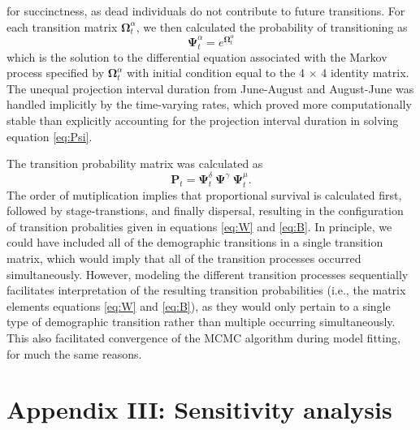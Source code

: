 \documentclass[11pt]{article}
\begin{document}
for succinctness, as dead individuals do not contribute to future transitions.
For each transition matrix $\boldsymbol\Omega^{\alpha}_t$, 
we then calculated the probability of transitioning as
%
\begin{equation} \label{eq:Psi}
\boldsymbol\Psi^{\alpha}_t = e^{\boldsymbol\Omega^{\alpha}_t}
\end{equation}
%
which is the solution to the differential equation associated with the Markov process
specified by $\boldsymbol\Omega^{\alpha}_t$ 
with initial condition equal to the 4 $\times$ 4 identity matrix.
The unequal projection interval duration from June-August and August-June was handled 
implicitly by the time-varying rates, 
which proved more computationally stable than explicitly accounting for the projection
interval duration in solving equation \ref{eq:Psi}.

The transition probability matrix was calculated as 
\begin{equation} \label{eq:POmega}
\mathbf{P}_{t} = \boldsymbol\Psi^{\delta}_t~\boldsymbol\Psi^{\gamma}~\boldsymbol\Psi^{\mu}_t.
\end{equation}
%
The order of mutiplication implies that proportional survival is calculated first,
followed by stage-transtions, and finally dispersal,
resulting in the configuration of transition probalities
given in equations \ref{eq:W} and \ref{eq:B}.
In principle, we could have included all of the demographic transitions in a single
transition matrix,
which would imply that all of the transition processes occurred simultaneously. 
However, modeling the different transition processes sequentially facilitates interpretation
of the resulting transition probabilities 
(i.e., the matrix elements equations \ref{eq:W} and \ref{eq:B}), 
as they would only pertain to a single type of demographic transition
rather than multiple occurring simultaneously.
This also facilitated convergence of the MCMC algorithm during model fitting, 
for much the same reasons.




\section*{Appendix III: Sensitivity analysis} 
\end{document}

